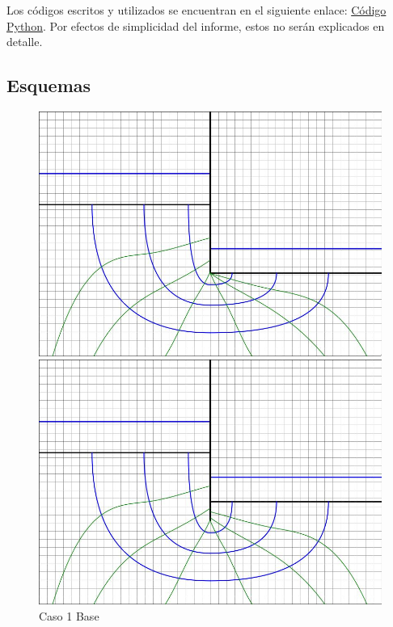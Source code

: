 Los códigos escritos y utilizados se encuentran en el siguiente enlace: \href{https://github.com/LukasWolff2002/PROYECTO_1_MCOC/tree/main/CODIGO}{Código Python}. Por efectos de simplicidad del informe, estos no serán explicados en detalle.

\subsection{Esquemas}

\begin{figure}[H]
  \centering
  \begin{minipage}{0.32\textwidth}
      \centering
      \includegraphics[width=\textwidth]{FOTOS/caso_1dibujo_base.jpg}
      \caption{Caso 1 Base}
  \end{minipage}
  \begin{minipage}{0.32\textwidth}
      \centering
      \includegraphics[width=\textwidth]{FOTOS/caso_2dibujo_base.jpg}

\end{minipage}
\end{figure}
